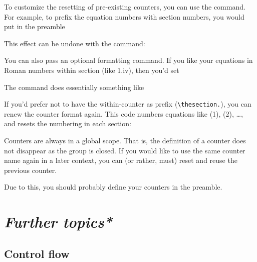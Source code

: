 To customize the resetting of pre-existing counters,
you can use the  command.
For example, to prefix the equation numbers with section numbers,
you would put in the preamble
%
\begin{ExampleCode}
\end{ExampleCode}
%
This effect can be undone with the  command:
%
\begin{ExampleCode}
\end{ExampleCode}
%
You can also pass an optional formatting command.
If you like your equations in Roman numbers within section (like 1.iv), then you'd set
%
\begin{ExampleCode}
\end{ExampleCode}
%
The  command does essentially something like
\begin{ExampleCode}
  \renewcommand{\theequation}{\thesection.\Roman{equation}}
\end{ExampleCode}
If you'd prefer not to have the within-counter as prefix (\verb|\thesection.|),
you can renew the counter format again.
This code numbers equations like (1), (2), \dots, and resets the numbering in each section:
%
\begin{ExampleCode}
\renewcommand\theequation{\arabic{equation}}
\end{ExampleCode}

\begin{technote}
Counters are always in a global scope.
That is, the definition of a counter does not disappear as the group is closed.
If you would like to use the same counter name again in a later context,
you can (or rather, must) reset and reuse the previous counter.

Due to this, you should probably define your counters in the preamble.
\end{technote}


%
%
%
\section{\emph{Further topics*}}

%
%
\subsection{Control flow}\label{sec:if}

